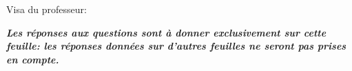 \documentclass[a4paper]{article}
\begin{document}
{\vspace*{2cm}Visa du professeur: \dotfill
\newpage




\vspace{1ex}



\begin{minipage}[b]{6.5cm}

  \hfill\vspace{5ex}
  \end{minipage}

  \vspace{1ex}
{\bf\em\setlength{\parindent}{0pt} Les réponses aux questions sont à donner \textit{exclusivement} sur cette feuille: les réponses données sur d'autres feuilles ne seront \textit{pas prises en compte}.


}}
\end{document}
